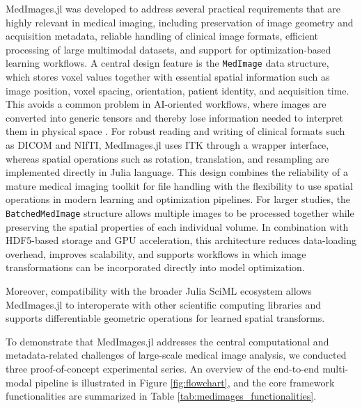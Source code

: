 \documentclass[10pt,letterpaper]{article}
\begin{document}
MedImages.jl was developed to address several practical requirements that are highly relevant in medical imaging, including preservation of image geometry and acquisition metadata, reliable handling of clinical image formats, efficient processing of large multimodal datasets, and support for optimization-based learning workflows. 
A central design feature is the \verb|MedImage| data structure, which stores voxel values together with essential spatial information such as image position, voxel spacing, orientation, patient identity, and acquisition time. This avoids a common problem in AI-oriented workflows, where images are converted into generic tensors and thereby lose information needed to interpret them in physical space \cite{}. 
For robust reading and writing of clinical formats such as DICOM and NIfTI, MedImages.jl uses ITK through a wrapper interface, whereas spatial operations such as rotation, translation, and resampling are implemented directly in Julia language. This design combines the reliability of a mature medical imaging toolkit for file handling with the flexibility to use spatial operations in modern learning and optimization pipelines. 
For larger studies, the \verb|BatchedMedImage| structure allows multiple images to be processed together while preserving the spatial properties of each individual volume. In combination with HDF5-based storage and GPU acceleration, this architecture reduces data-loading overhead, improves scalability, and supports workflows in which image transformations can be incorporated directly into model optimization.  

Moreover, compatibility with the broader Julia SciML ecosystem allows MedImages.jl to interoperate with other scientific computing libraries and supports differentiable geometric operations for learned spatial transforms.  

To demonstrate that MedImages.jl addresses the central computational and metadata-related challenges of large-scale medical image analysis, we conducted three proof-of-concept experimental series. An overview of the end-to-end multi-modal pipeline is illustrated in Figure \ref{fig:flowchart}, and the core framework functionalities are summarized in Table \ref{tab:medimages_functionalities}.
\end{document}
